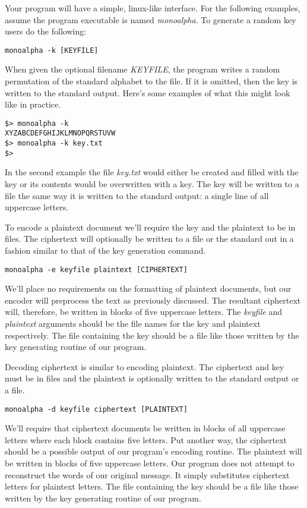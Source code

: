 \documentclass[]{tufte-handout}
\begin{document}
Your program will have a simple, linux-like interface. For the following examples, assume the program executable is named \textit{monoalpha}. To generate a random key users do the following:
\begin{verbatim}
monoalpha -k [KEYFILE]
\end{verbatim}  
When given the optional filename \textit{KEYFILE}, the program writes a random permutation of the standard alphabet to the file. If it is omitted, then the key is written to the standard output. Here's some examples of what this might look like in practice.
\begin{verbatim}
$> monoalpha -k
XYZABCDEFGHIJKLMNOPQRSTUVW
$> monoalpha -k key.txt
$>
\end{verbatim}
In the second example the file \textit{key.txt} would either be created and filled with the key or its contents would be overwritten with a key. The key will be written to a file the same way it is written to the standard output: a single line of all uppercase letters.

To encode a plaintext document we'll require the key and the plaintext to be in files.  The ciphertext will optionally be written to a file or the standard out in a fashion similar to that of the key generation command.
\begin{verbatim}
monoalpha -e keyfile plaintext [CIPHERTEXT]
\end{verbatim}
We'll place no requirements on the formatting of plaintext documents, but our encoder will preprocess the text as previously discussed. The resultant ciphertext will, therefore, be written in blocks of five uppercase letters. The \textit{keyfile} and \textit{plaintext} arguments should be the file names for the key and plaintext respectively. The file containing the key should be a file like those written by the key generating routine of our program.

Decoding ciphertext is similar to encoding plaintext. The ciphertext and key must be in files and the plaintext is optionally written to the standard output or a file. 
\begin{verbatim}
monoalpha -d keyfile ciphertext [PLAINTEXT]
\end{verbatim}
We'll require that ciphertext documents be written in blocks of all uppercase letters where each block contains five letters.  Put another way, the ciphertext should be a possible output of our program's encoding routine.  The plaintext will be written in blocks of five uppercase letters. Our program does not attempt to reconstruct the words of our original message. It simply substitutes ciphertext letters for plaintext letters. The file containing the key should be a file like those written by the key generating routine of our program.
\end{document}
